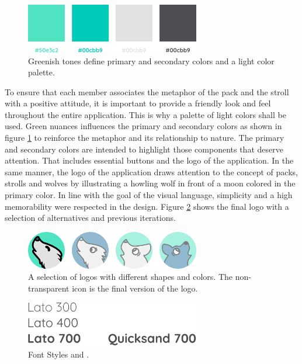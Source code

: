 \documentclass[12pt,numbers=noenddot,parskip,bibliography=totocnumbered,listof=totocnumbered]{scrreprt}
\begin{document}
\begin{figure}
\centering
\includegraphics[width=0.68\textwidth]{img/colors.png}
\caption{Greenish tones define primary and secondary colors and a light color palette.}
\label{colorpalette}
\end{figure}

To ensure that each member associates the metaphor of the pack and the stroll with a positive attitude, it is important to provide a friendly look and feel throughout the entire application. This is why a palette of light colors shall be used. Green nuances influences the primary and secondary colors as shown in figure \ref{colorpalette} to reinforce the metaphor and its relationship to nature. The primary and secondary colors are intended to highlight those components that deserve attention. That includes essential buttons and the logo of the application. In the same manner, the logo of the application draws attention to the concept of packs, strolls and wolves by illustrating a howling wolf in front of a moon colored in the primary color. In line with the goal of the visual language, simplicity and a high memorability were respected in the design. Figure \ref{icons} shows the final logo with a selection of alternatives and previous iterations.

\begin{figure}
\centering
\includegraphics[width=0.68\textwidth]{img/icons.png}
\caption{A selection of logos with different shapes and colors. The non-transparent icon is the final version of the logo.}
\label{icons}
\end{figure}



\begin{figure}
\centering
\includegraphics[width=0.68\textwidth]{img/fonts.png}
\caption{Font Styles and .}
\label{fontstyles}
\end{figure}
\end{document}

